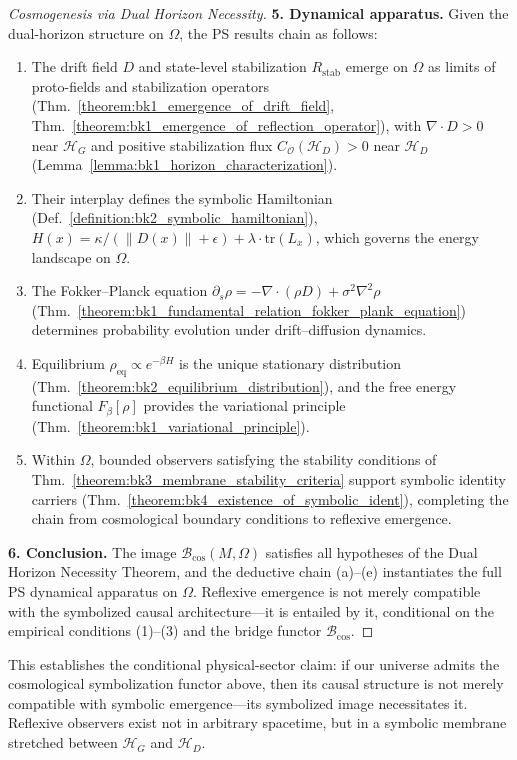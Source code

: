 \begin{proof}[Cosmogenesis via Dual Horizon Necessity]
\textbf{5. Dynamical apparatus.}\enspace
Given the dual-horizon structure on $\Omega$, the PS results chain as follows:
\begin{enumerate}
    \item[\emph{(a)}] The drift field $D$ and state-level stabilization \(R_{\mathrm{stab}}\) emerge on $\Omega$ as limits of proto-fields and stabilization operators (Thm.~\ref{theorem:bk1_emergence_of_drift_field}, Thm.~\ref{theorem:bk1_emergence_of_reflection_operator}), with $\nabla \cdot D > 0$ near $\mathcal{H}_G$ and positive stabilization flux \(C_{\mathcal{O}}(\mathcal{H}_D)>0\) near $\mathcal{H}_D$ (Lemma~\ref{lemma:bk1_horizon_characterization}).
    \item[\emph{(b)}] Their interplay defines the symbolic Hamiltonian (Def.~\ref{definition:bk2_symbolic_hamiltonian}), $H(x) = \kappa / (\|D(x)\| + \epsilon) + \lambda \cdot \mathrm{tr}(L_x)$, which governs the energy landscape on $\Omega$.
    \item[\emph{(c)}] The Fokker--Planck equation $\partial_s \rho = -\nabla \cdot (\rho D) + \sigma^2 \nabla^2 \rho$ (Thm.~\ref{theorem:bk1_fundamental_relation_fokker_plank_equation}) determines probability evolution under drift--diffusion dynamics.
    \item[\emph{(d)}] Equilibrium $\rho_{\mathrm{eq}} \propto e^{-\beta H}$ is the unique stationary distribution (Thm.~\ref{theorem:bk2_equilibrium_distribution}), and the free energy functional $F_\beta[\rho]$ provides the variational principle (Thm.~\ref{theorem:bk1_variational_principle}).
    \item[\emph{(e)}] Within $\Omega$, bounded observers satisfying the stability conditions of Thm.~\ref{theorem:bk3_membrane_stability_criteria} support symbolic identity carriers (Thm.~\ref{theorem:bk4_existence_of_symbolic_ident}), completing the chain from cosmological boundary conditions to reflexive emergence.
\end{enumerate}

\textbf{6. Conclusion.}\enspace
The image $\mathcal{B}_{\mathrm{cos}}(M,\Omega)$ satisfies all hypotheses of the Dual Horizon Necessity Theorem, and the deductive chain (a)--(e) instantiates the full PS dynamical apparatus on $\Omega$. Reflexive emergence is not merely compatible with the symbolized causal architecture---it is entailed by it, conditional on the empirical conditions (1)--(3) and the bridge functor $\mathcal{B}_{\mathrm{cos}}$.
\end{proof}
\begin{remark}
This establishes the conditional physical-sector claim: if our universe admits the cosmological symbolization functor above, then its causal structure is not merely compatible with symbolic emergence---its symbolized image necessitates it. Reflexive observers exist not in arbitrary spacetime, but in a symbolic membrane stretched between $\mathcal{H}_G$ and $\mathcal{H}_D$.
\end{remark}

